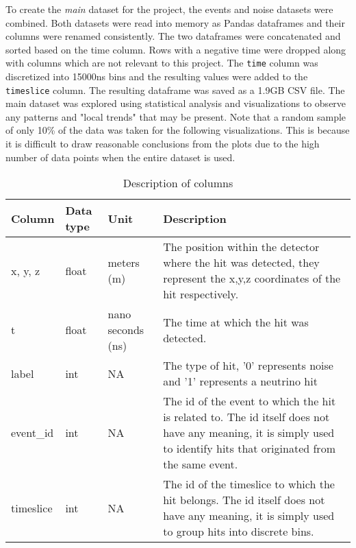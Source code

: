 To create the \emph{main} dataset for the project, the events and
noise datasets were combined. Both datasets were read into memory as
Pandas dataframes and their columns were renamed consistently. The two
dataframes were concatenated and sorted based on the time column. Rows
with a negative time were dropped along with columns which are not
relevant to this project. The \texttt{time} column was discretized
into 15000ns bins and the resulting values were added to the
\texttt{timeslice} column. The resulting dataframe was saved as a
1.9GB CSV file. The main dataset was explored using statistical
analysis and visualizations to observe any patterns and "local trends"
that may be present. Note that a random sample of only 10\% of the
data was taken for the following visualizations. This is because it is
difficult to draw reasonable conclusions from the plots due to the
high number of data points when the entire dataset is used.

\begin{table}[h]
  \centering
  \caption{Description of columns}
  \label{tab:desc-cols}
  \begin{tabular}{p{1.5cm}p{1.5cm}p{2cm}p{8cm}}
    \hline
    Column & Data type & Unit & Description \\
    \hline
    x, y, z & float & meters (m) & The position within the detector
    where the hit was detected, they represent the x,y,z coordinates
    of the hit respectively. \\
    t & float & nano seconds (ns) & The time at which the hit was
    detected. \\
    label & int & NA & The type of hit, '0' represents noise and '1'
    represents a neutrino hit \\
    event\_id & int & NA & The id of the event to which the hit is
    related to. The id itself does not have any meaning, it is simply
    used to identify hits that originated from the same event. \\
    timeslice & int & NA & The id of the timeslice to which the hit
    belongs. The id itself does not have any meaning, it is simply
    used to group hits into discrete bins. \\
    \hline
  \end{tabular}
\end{table}

